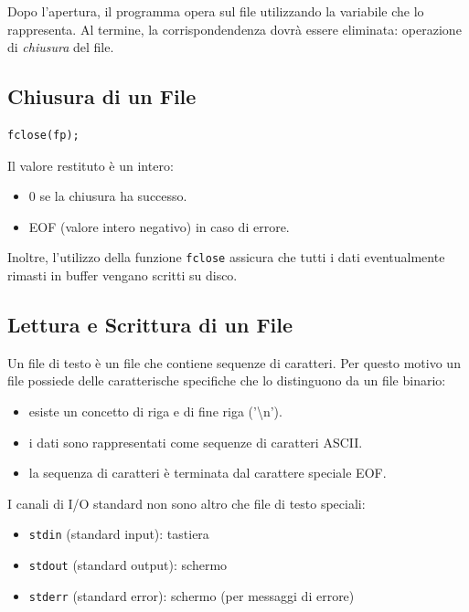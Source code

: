\documentclass[oneside]{scrbook}
\begin{document}
Dopo l'apertura, il programma opera sul file utilizzando la variabile che lo rappresenta.
Al termine, la corrispondendenza dovrà essere eliminata: operazione di \emph{chiusura} del file.

\subsection{Chiusura di un File}

\begin{lstlisting}[style=cstyle]
fclose(fp);
\end{lstlisting}

Il valore restituto è un intero:
\begin{itemize}
    \item 0 se la chiusura ha successo.
    \item EOF (valore intero negativo) in caso di errore.
\end{itemize}

Inoltre, l'utilizzo della funzione \texttt{fclose} assicura che tutti i dati eventualmente rimasti in buffer vengano scritti su disco.

\subsection{Lettura e Scrittura di un File}
Un file di testo è un file che contiene sequenze di caratteri. Per questo motivo un file
possiede delle caratterische specifiche che lo distinguono da un file binario:

\begin{itemize}
    \item esiste un concetto di riga e di fine riga ('\textbackslash n').
    \item i dati sono rappresentati come sequenze di caratteri ASCII.
    \item la sequenza di caratteri è terminata dal carattere speciale EOF.
\end{itemize}

I canali di I/O standard non sono altro che file di testo speciali:
\begin{itemize}
    \item \texttt{stdin} (standard input): tastiera
    \item \texttt{stdout} (standard output): schermo
    \item \texttt{stderr} (standard error): schermo (per messaggi di errore)
\end{itemize}
\end{document}
